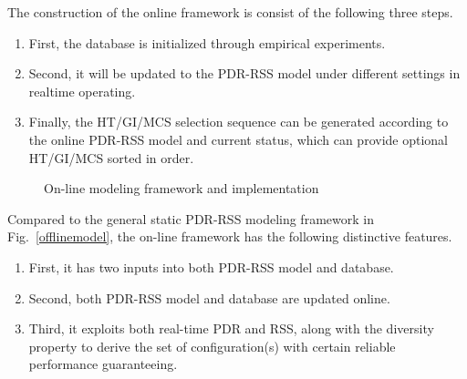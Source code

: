\documentclass[draftclsnofoot,journal,onecolumn,11pt]{IEEEtran}
\begin{document}
The construction of the online framework is consist of the following three steps.
\begin{enumerate}
  \item First, the database is initialized through empirical experiments.
  \item Second, it will be updated to the PDR-RSS model under different settings in realtime operating.
  \item Finally, the HT/GI/MCS selection sequence can be generated according to the online PDR-RSS model and current status, which can provide optional HT/GI/MCS sorted in order.
\end{enumerate}

\begin{figure}[!htp]
\centerline{
}
\caption{On-line modeling framework and implementation}
\label{implamentation}
\end{figure}

Compared to the general static PDR-RSS modeling framework in Fig.~\ref{offlinemodel}, the on-line framework has the following distinctive features.
\begin{enumerate}
  \item First, it has two inputs into both PDR-RSS model and database.
  \item Second, both PDR-RSS model and database are updated online.
  \item Third, it exploits both real-time PDR and RSS, along with the diversity property to derive the set of configuration(s) with certain reliable performance guaranteeing.
\end{enumerate}
\end{document}
